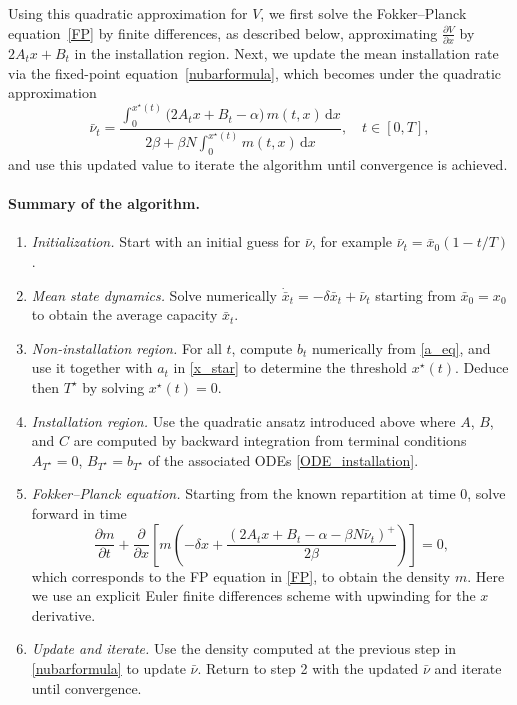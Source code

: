 \documentclass[12pt]{article}
\begin{document}
Using this quadratic approximation for \(V\), we first solve the Fokker–Planck equation~\eqref{FP} by finite differences, as described below, approximating \(\frac{\partial V}{\partial x}\) by \(2A_t x + B_t\) in the installation region. Next, we update the mean installation rate via the fixed-point equation~\eqref{nubarformula}, which becomes under the quadratic approximation
\[
\bar{\nu}_t = \frac{ \int_{0}^{x^\star(t)} \bigl(2A_t x + B_t - \alpha\bigr)\,m(t,x)\,\mathrm{d}x}{2\beta + \beta N \int_{0}^{x^\star(t)} m(t,x)\,\mathrm{d}x}, \quad t \in [0,T],
\]
and use this updated value to iterate the algorithm until convergence is achieved.

\paragraph{Summary of the algorithm.}\label{algorithm}

\begin{enumerate}\itemsep -2pt
    \item \textit{Initialization.} Start with an initial guess for $\bar{\nu}$, for example $\bar{\nu}_t=\bar{x}_0(1-t/T)$.
    \item \textit{Mean state dynamics.} Solve numerically $\dot{\bar{x}}_t = - \delta \bar{x}_t+\bar{\nu}_t$ starting from $\bar{x}_0 = x_0$ to obtain the average capacity $\bar{x}_t$.
    \item \textit{Non-installation region.} For all $t$, compute $b_t$ numerically from \eqref{a_eq}, and use it together with $a_t$ in \eqref{x_star} to determine the threshold $x^\star(t)$. Deduce then $T^\star$ by solving $x^\star(t)=0$.
    \item \textit{Installation region.} Use the quadratic ansatz introduced above where $A$, $B$, and $C$ are computed by backward integration from terminal conditions $A_{T^\star} = 0$, $B_{T^\star} = b_{T^\star}$ of the associated ODEs \eqref{ODE_installation}.
    \item \textit{Fokker–Planck equation.} Starting from the known repartition at time $0$, solve forward in time
    \[
    \frac{\partial m}{\partial t} + \frac{\partial}{\partial x} \left[ m\left( -\delta x + \frac{(2A_t x + B_t - \alpha - \beta N \bar{\nu}_t)^+}{2\beta} \right) \right] = 0,
    \]
    which corresponds to the FP equation in \eqref{FP}, to obtain the density $m$. Here we use an explicit Euler finite differences scheme with upwinding for the $x$ derivative. 
    \item \textit{Update and iterate.} Use the density computed at the previous step in \eqref{nubarformula} to update $\bar{\nu}$. Return to step 2 with the updated $\bar{\nu}$ and iterate until convergence.
\end{enumerate}
\end{document}
